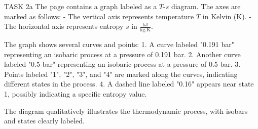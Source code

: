 TASK 2a  
The page contains a graph labeled as a \( T \)-\( s \) diagram. The axes are marked as follows:  
- The vertical axis represents temperature \( T \) in Kelvin (K).  
- The horizontal axis represents entropy \( s \) in \( \frac{\text{kJ}}{\text{kg·K}} \).  

The graph shows several curves and points:  
1. A curve labeled "0.191 bar" representing an isobaric process at a pressure of 0.191 bar.  
2. Another curve labeled "0.5 bar" representing an isobaric process at a pressure of 0.5 bar.  
3. Points labeled "1", "2", "3", and "4" are marked along the curves, indicating different states in the process.  
4. A dashed line labeled "0.16" appears near state 1, possibly indicating a specific entropy value.  

The diagram qualitatively illustrates the thermodynamic process, with isobars and states clearly labeled.